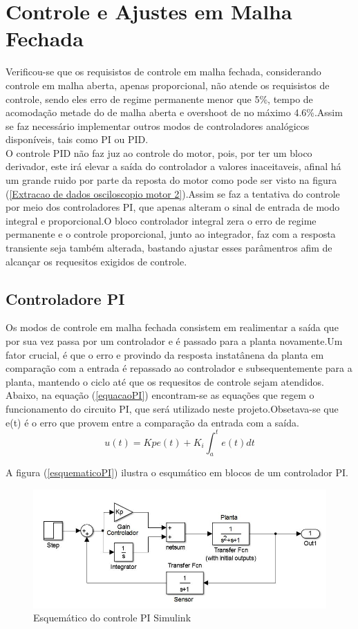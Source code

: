 \documentclass[11pt, a4paper, oneside]{article}
\begin{document}
\section{Controle e Ajustes em Malha Fechada}
Verificou-se que os requisistos de controle em malha fechada, considerando controle em malha aberta, apenas proporcional, não atende os requisistos de controle, sendo eles erro de regime permanente menor que 5\%, tempo de acomodação metade do de malha aberta e overshoot  de no máximo 4.6\%.Assim se faz necessário implementar outros modos de controladores analógicos disponíveis, tais como PI ou PID.\\
O controle PID não faz juz ao controle do motor, pois, por ter um bloco derivador, este irá elevar a saída do controlador a valores inaceitaveis, afinal há um grande ruido por parte da reposta do motor como pode ser visto na figura (\ref{Extracao de dados osciloscopio motor 2}).Assim se faz a tentativa do controle por meio dos controladores PI, que apenas alteram o sinal de entrada de modo integral e proporcional.O bloco controlador integral zera o erro de regime permanente e o controle proporcional, junto ao integrador, faz com a resposta transiente seja também alterada, bastando ajustar esses parâmentros afim de alcançar os requesitos exigidos de controle.
\subsection{Controladore PI}
Os modos de controle em malha fechada consistem em realimentar a saída que por sua vez  passa por um controlador e é passado para a planta novamente.Um fator crucial, é que o erro e provindo da resposta instatânena da planta em comparação com a entrada é repassado ao controlador e subsequentemente para a planta, mantendo o ciclo até que os requesitos de controle sejam atendidos.\\
Abaixo, na equação (\ref{equacaoPI}) encontram-se as equações que regem o funcionamento do circuito PI, que será utilizado neste projeto.Obsetava-se que e(t)  é o erro que provem entre a comparação da entrada com a saída.
 \begin{equation}
 u(t)=Kpe(t)+ K_i\int_{a}^{t}e(t)dt
 \label{equacaoPI}
 \end{equation}
 
 A figura (\ref{esquematicoPI}) ilustra o esqumático em blocos de um controlador PI.
 
\begin{figure}[h!]
\centering
\includegraphics[width=.7\linewidth]{Pi_controler.jpg}
\caption{Esquemático do controle PI Simulink}	
\label{esquematicoPI_simulink}
\end{figure}
\end{document}
